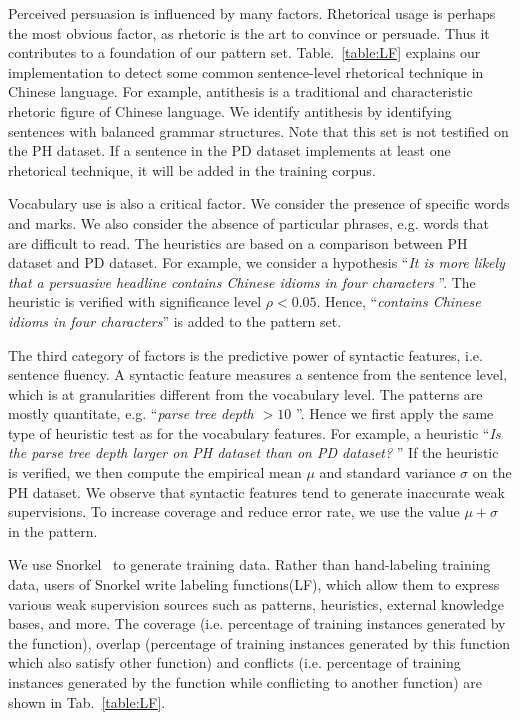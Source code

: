 \documentclass[sigconf]{acmart}
\begin{document}
Perceived persuasion is influenced by many factors.  Rhetorical usage is perhaps the most obvious factor, as rhetoric is the art to convince or persuade. Thus it contributes to a foundation  of our pattern set. Table.~\ref{table:LF} explains our implementation to detect some common sentence-level rhetorical technique in Chinese language. For example, antithesis is a traditional and characteristic rhetoric figure of Chinese language. We identify antithesis by identifying sentences with balanced grammar structures. Note that this set is not testified on the PH dataset. If a sentence in the PD dataset implements at least one rhetorical technique, it will be added in the training corpus.

Vocabulary use is also a critical factor. We consider the presence of specific words and marks. We also consider the absence of particular phrases, e.g. words that are difficult to read. The heuristics are based on a comparison between PH dataset and PD dataset. For example, we consider a hypothesis ``\textit{It is more likely that a persuasive headline contains Chinese idioms in four characters }''. The heuristic is verified with significance level $\rho<0.05$. Hence, ``\textit{contains Chinese idioms in four characters}'' is added to the pattern set.  

The third category of factors is the predictive power of syntactic features, i.e. sentence fluency. A syntactic feature measures a sentence from the sentence level, which is at granularities different from the vocabulary level.
The patterns are mostly quantitate, e.g. ``\textit{parse tree depth $>10$ }''. 
Hence we first apply the same type of heuristic test as for the vocabulary features.  
For example, a heuristic ``\textit{Is the parse tree depth larger on PH dataset than on PD dataset? }'' 
If the heuristic is verified, we then compute the empirical mean $\mu$ and standard variance $\sigma$ on the PH dataset.
We observe that syntactic features tend to generate inaccurate weak supervisions.
To increase coverage and reduce  error rate, we use the value $\mu+\sigma$ in the pattern.

We use Snorkel~\cite{ratner2017snorkel}  to generate training data. Rather than hand-labeling training data, users of Snorkel write labeling functions(LF), which allow them to express various weak supervision sources such as patterns, heuristics, external knowledge bases, and more. The coverage (i.e. percentage of training instances generated by the function), overlap (percentage of training instances generated by this function which also satisfy other function) and conflicts (i.e. percentage of training instances generated by the function while conflicting to another function) are shown in Tab.~\ref{table:LF}. 
\end{document}
